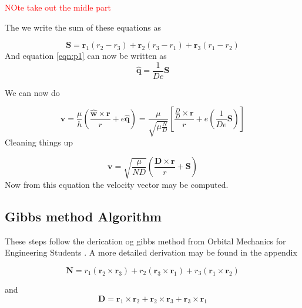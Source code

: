 \documentclass[12pt]{article}
\begin{document}
\textcolor{red}{	NOte take out the midle part}

The we write the sum of these equations as 

	\begin{equation}
	\mathbf { S } = \mathbf { r } _ { 1 } \left( r _ { 2 } - r _ { 3 } \right) + \mathbf { r } _ { 2 } \left( r _ { 3 } - r _ { 1 } \right) + \mathbf { r } _ { 3 } \left( r _ { 1 } - r _ { 2 } \right)
	\end{equation}
	And equation \ref{eqn:p1} can now be written as 
	\begin{equation}
	\hat { \mathbf { q } } = \frac { 1 } { D e } \mathbf { S }
	\end{equation}
	
	We can now do
	
	\begin{equation}
	\mathbf { v } = \frac { \mu } { h } \left( \frac { \hat { \mathbf { w } } \times \mathbf { r } } { r } + e \hat { \mathbf { q } } \right)=\frac { \mu } { \sqrt { \mu \frac { N } { D } } } \left[ \frac { \frac { D } { D } \times \mathbf { r } } { r } + e \left( \frac { 1 } { D e } \mathbf { S } \right) \right]
	\end{equation}
	Cleaning things up
	
	\begin{equation}
	\mathbf { v } = \sqrt { \frac { \mu } { N D } } \left( \frac { \mathbf { D } \times \mathbf { r } } { r } + \mathbf { S } \right)
	\end{equation}
	 Now from this equation the velocity vector may be computed. 
	\iffalse
	\subsection{Gibbs method Algorithm}
	These steps follow the derication og gibbs method from Orbital Mechanics for Engineering Students \cite{curtis2013_gibbs}. A more detailed derivation may be found in the appendix
	
	\begin{equation}
	\mathbf { N } = r _ { 1 } \left( \mathbf { r } _ { 2 } \times \mathbf { r } _ { 3 } \right) + r _ { 2 } \left( \mathbf { r } _ { 3 } \times \mathbf { r } _ { 1 } \right) + r _ { 3 } \left( \mathbf { r } _ { 1 } \times \mathbf { r } _ { 2 } \right)
	\end{equation}
	
	and
	\begin{equation}
	\mathbf { D } = \mathbf { r } _ { 1 } \times \mathbf { r } _ { 2 } + \mathbf { r } _ { 2 } \times \mathbf { r } _ { 3 } + \mathbf { r } _ { 3 } \times \mathbf { r } _ { 1 }
	\end{equation}
	
\end{document}

